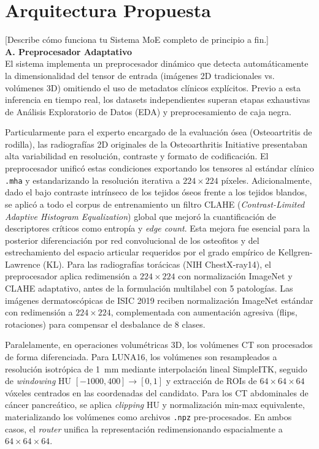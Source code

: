 \documentclass[conference, 11pt]{IEEEtran}
\begin{document}
\section{Arquitectura Propuesta}
[Describe cómo funciona tu Sistema MoE completo de principio a fin.] \\

\textbf{A. Preprocesador Adaptativo} \\
El sistema implementa un preprocesador dinámico que detecta automáticamente la dimensionalidad del tensor de entrada (imágenes 2D tradicionales vs. volúmenes 3D) omitiendo el uso de metadatos clínicos explícitos. Previo a esta inferencia en tiempo real, los datasets independientes superan etapas exhaustivas de Análisis Exploratorio de Datos (EDA) y preprocesamiento de caja negra.
    
Particularmente para el experto encargado de la evaluación ósea (Osteoartritis de rodilla), las radiografías 2D originales de la Osteoarthritis Initiative presentaban alta variabilidad en resolución, contraste y formato de codificación. El preprocesador unificó estas condiciones exportando los tensores al estándar clínico \texttt{.mha} y estandarizando la resolución iterativa a $224 \times 224$ píxeles. Adicionalmente, dado el bajo contraste intrínseco de los tejidos óseos frente a los tejidos blandos, se aplicó a todo el corpus de entrenamiento un filtro CLAHE (\textit{Contrast-Limited Adaptive Histogram Equalization}) global que mejoró la cuantificación de descriptores críticos como entropía y \textit{edge count}. Esta mejora fue esencial para la posterior diferenciación por red convolucional de los osteofitos y del estrechamiento del espacio articular requeridos por el grado empírico de Kellgren-Lawrence (KL). Para las radiografías torácicas (NIH ChestX-ray14), el preprocesador aplica redimensión a $224 \times 224$ con normalización ImageNet y CLAHE adaptativo, antes de la formulación multilabel con 5 patologías. Las imágenes dermatoscópicas de ISIC 2019 reciben normalización ImageNet estándar con redimensión a $224 \times 224$, complementada con aumentación agresiva (flips, rotaciones) para compensar el desbalance de 8 clases.

Paralelamente, en operaciones volumétricas 3D, los volúmenes CT son procesados de forma diferenciada. Para LUNA16, los volúmenes son resampleados a resolución isotrópica de 1~mm mediante interpolación lineal SimpleITK, seguido de \textit{windowing} HU $[-1000, 400] \rightarrow [0, 1]$ y extracción de ROIs de $64 \times 64 \times 64$ vóxeles centrados en las coordenadas del candidato. Para los CT abdominales de cáncer pancreático, se aplica \textit{clipping} HU y normalización min-max equivalente, materializando los volúmenes como archivos \texttt{.npz} pre-procesados. En ambos casos, el \textit{router} unifica la representación redimensionando espacialmente a $64 \times 64 \times 64$. \\
\end{document}
